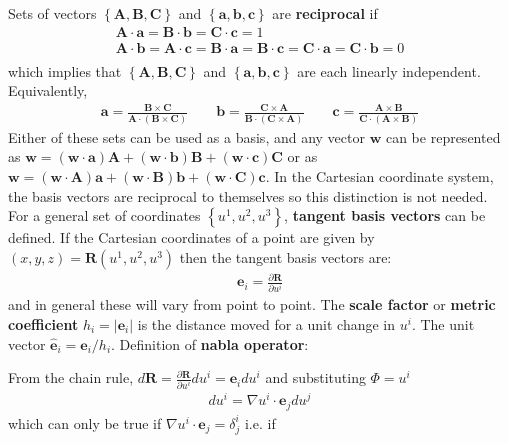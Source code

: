 \documentclass[12pt]{article}
\def\L{\left}
\def\R{\right}
\newcommand{\ve}[1]{\ensuremath{\boldsymbol{#1}}}
\newcommand{\hv}[1]{\hat{\ve{#1}}}
\newcommand{\bvec}{\ve{b}}
\newcommand{\Bvec}{\ve{B}}
\begin{document}
Sets of vectors $\L\{\mathbf{A, B, C}\R\}$ and $\L\{\mathbf{a, b, c}\R\}$ are
{\bf reciprocal} if
%
\begin{align*}
\mathbf{A\cdot a} = \mathbf{B\cdot b} = \mathbf{C\cdot c} = 1\\ \mathbf{A\cdot
b} = \mathbf{A\cdot c} = \mathbf{B\cdot a} = \mathbf{B\cdot c} = \mathbf{C\cdot
a} = \mathbf{C\cdot b} = 0 \\
\end{align*}
%
which implies that $\L\{\mathbf{A, B, C}\R\}$ and $\L\{\mathbf{a, b, c}\R\}$
are each linearly independent.  Equivalently,
%
\begin{align*}
\mathbf{a} = \frac{\mathbf{B\times C}}{\mathbf{A\cdot\L(B\times C\R)}}\qquad
\bvec = \frac{\mathbf{C\times A}}{\mathbf{B\cdot\L(C\times A\R)}}\qquad
\mathbf{c} = \frac{\mathbf{A\times B}}{\mathbf{C\cdot\L(A\times B\R)}}
\end{align*}
%
Either of these sets can be used as a basis, and any vector $\mathbf{w}$ can be
represented as $\mathbf{w} = \L(\mathbf{w\cdot a}\R)\mathbf{A} +
\L(\mathbf{w\cdot b}\R)\Bvec + \L(\mathbf{w\cdot c}\R)\mathbf{C}$ or as
$\mathbf{w} = \L(\mathbf{w\cdot A}\R)\mathbf{a} + \L(\mathbf{w\cdot B}\R)\bvec
+ \L(\mathbf{w\cdot C}\R)\mathbf{c}$. In the Cartesian coordinate system, the
basis vectors are reciprocal to themselves so this distinction is not needed.
For a general set of coordinates $\L\{u^1, u^2, u^3\R\}$, {\bf tangent basis
vectors} can be defined. If the Cartesian coordinates of a point are given by
$\L(x, y, z\R) = \mathbf{R}\L(u^1, u^2, u^3\R)$ then the tangent basis vectors
are:
%
\begin{align*}
\ve{e}_i = \frac{\partial\mathbf{R}}{\partial u^i}
\end{align*}
%
and in general these will vary from point to point. The {\bf scale factor} or
{\bf metric coefficient} $h_i =\L|\ve{e}_i\R| $ is the distance moved for a
unit change in $u^i$. The unit vector $\hv{e}_i = \ve{e}_i/h_i$.  Definition
of {\bf nabla operator}:
%
\begin{center}
\end{center}
%
From the chain rule, $d\mathbf{R} = \frac{\partial\mathbf{R}}{\partial u^i}du^i
= \ve{e}_idu^i$ and substituting $\Phi = u^i$
%
\begin{align*}
du^i = \nabla u^i\cdot\ve{e}_jdu^j
\end{align*}
%
which can only be true if $\nabla u^i\cdot\ve{e}_j = \delta^i_j$ i.e. if
\end{document}
